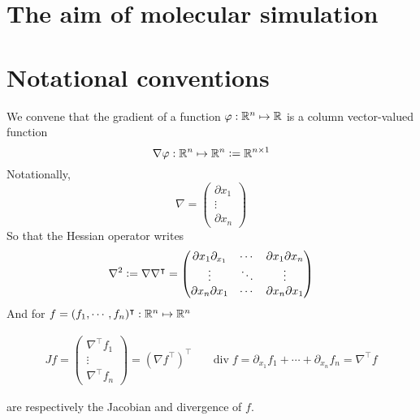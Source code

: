 \section*{The aim of molecular simulation}
\section*{Notational conventions}
We convene that the gradient of a function $\varphi : \mathbb{R}^n \mapsto \mathbb{R}$ is a column vector-valued function
$$\nabla \varphi : \mathbb{R}^n \mapsto \mathbb{R}^n \mathrel{\mathop:}= \mathbb{R}^{n\times 1}$$
Notationally,
$$\nabla = \begin{pmatrix} \partial x_1 \\ \vdots \\ \partial x_n\end{pmatrix}$$
So that the Hessian operator writes
$$\nabla^2 \mathrel{\mathop:}= \nabla\nabla^\intercal = \begin{pmatrix}
\partial{x_1}\partial_{x_1} & \dotsm & \partial{x_1}\partial{x_n} \\
 \vdots & \ddots & \vdots \\
 \partial{x_n}\partial{x_1} & \dotsm & \partial{x_n}\partial{x_1}    
\end{pmatrix}$$
And for $f=(f_1,\dotsm, f_n)^\intercal: \mathbb{R}^n \mapsto \mathbb{R}^n$

\begin{align*}
Jf=\begin{pmatrix}
    \nabla^\intercal f_1 \\ \vdots \\ \nabla^\intercal f_n
\end{pmatrix}=(\nabla f^\intercal)^\intercal && 
\operatorname{div} f=\partial_{x_1}f_1+\dotsm+\partial_{x_n}f_n=\nabla^\intercal f
\end{align*}

are respectively the Jacobian and divergence of $f$.